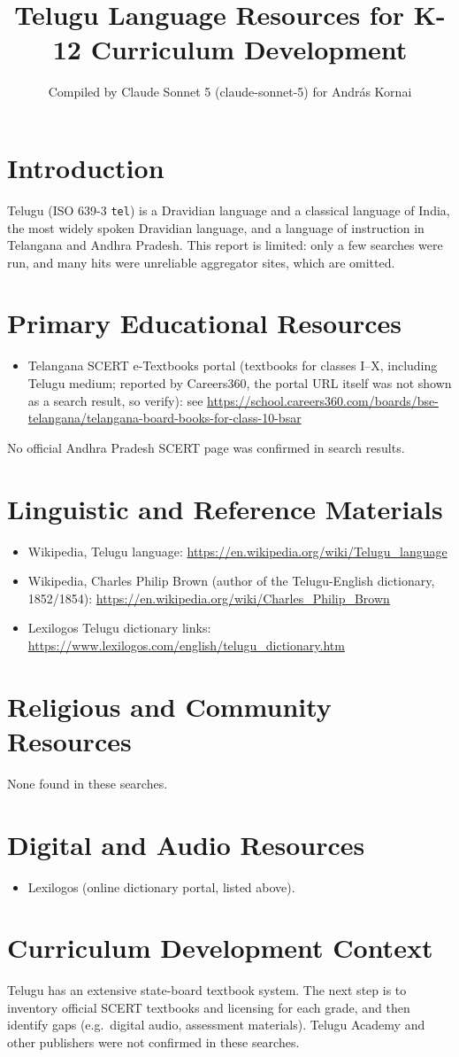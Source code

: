 \documentclass[12pt]{article}
\title{Telugu Language Resources for K-12 Curriculum Development}
\author{Compiled by Claude Sonnet 5 (claude-sonnet-5) for Andr\'as Kornai}
\date{}
\begin{document}
\maketitle
\section{Introduction}
Telugu (ISO 639-3 \texttt{tel}) is a Dravidian language and a classical language of India, the most widely spoken Dravidian language, and a language of instruction in Telangana and Andhra Pradesh. This report is limited: only a few searches were run, and many hits were unreliable aggregator sites, which are omitted.
\section{Primary Educational Resources}
\begin{itemize}
\item Telangana SCERT e-Textbooks portal (textbooks for classes I--X, including Telugu medium; reported by Careers360, the portal URL itself was not shown as a search result, so verify): see \url{https://school.careers360.com/boards/bse-telangana/telangana-board-books-for-class-10-bsar}
\end{itemize}
No official Andhra Pradesh SCERT page was confirmed in search results.
\section{Linguistic and Reference Materials}
\begin{itemize}
\item Wikipedia, Telugu language: \url{https://en.wikipedia.org/wiki/Telugu_language}
\item Wikipedia, Charles Philip Brown (author of the Telugu-English dictionary, 1852/1854): \url{https://en.wikipedia.org/wiki/Charles_Philip_Brown}
\item Lexilogos Telugu dictionary links: \url{https://www.lexilogos.com/english/telugu_dictionary.htm}
\end{itemize}
\section{Religious and Community Resources}
None found in these searches.
\section{Digital and Audio Resources}
\begin{itemize}
\item Lexilogos (online dictionary portal, listed above).
\end{itemize}
\section{Curriculum Development Context}
Telugu has an extensive state-board textbook system. The next step is to inventory official SCERT textbooks and licensing for each grade, and then identify gaps (e.g.\ digital audio, assessment materials). Telugu Academy and other publishers were not confirmed in these searches.
\end{document}
